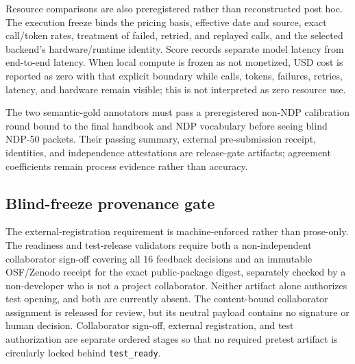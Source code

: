 \documentclass[11pt]{article}
\begin{document}
Resource comparisons are also preregistered rather than reconstructed
post hoc. The execution freeze binds the pricing basis, effective date and
source, exact call/token rates, treatment of failed, retried, and replayed
calls, and the selected backend's hardware/runtime identity. Score records
separate model latency from end-to-end latency. When local compute is frozen as
not monetized, USD cost is reported as zero with that explicit boundary while
calls, tokens, failures, retries, latency, and hardware remain visible; this is
not interpreted as zero resource use.

The two semantic-gold annotators must pass a preregistered non-NDP calibration
round bound to the final handbook and NDP vocabulary before seeing blind NDP-50
packets. Their passing summary, external pre-submission receipt, identities, and
independence attestations are release-gate artifacts; agreement coefficients
remain process evidence rather than accuracy.

\subsection{Blind-freeze provenance gate}

\begin{center}
\end{center}

The external-registration requirement is machine-enforced rather than
prose-only. The readiness and test-release validators require both a
non-independent collaborator sign-off covering all 16 feedback decisions and
an immutable OSF/Zenodo receipt for the exact public-package digest, separately
checked by a non-developer who is not a project collaborator. Neither artifact
alone authorizes test opening, and both are currently absent. The
content-bound collaborator assignment is released for review, but its neutral
payload contains no signature or human decision. Collaborator sign-off,
external registration, and test authorization are separate ordered stages so
that no required pretest artifact is circularly locked behind
\texttt{test\_ready}.
\end{document}
